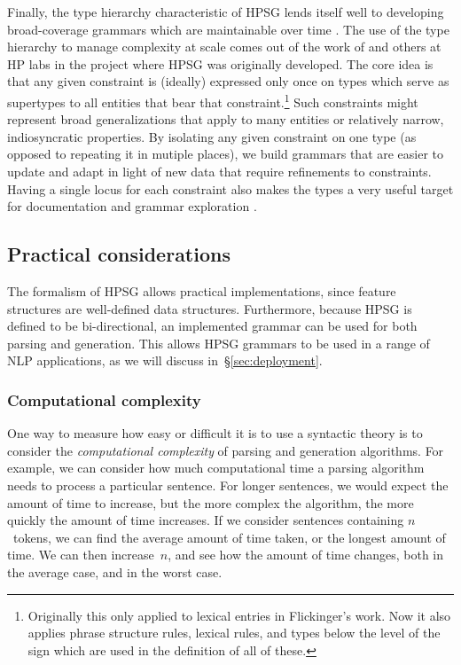 \documentclass[output=paper]{langsci/langscibook}
\begin{document}
Finally, the type hierarchy characteristic of HPSG lends itself well to developing broad-coverage grammars which are maintainable over time \citep{FIXME-find-cite?}. The use of the type hierarchy to manage complexity at scale comes out of the work of \citet{Flickinger87} and others at HP labs in the project where HPSG was originally developed. The core idea is that any given constraint is (ideally) expressed only once on types which serve as supertypes to all entities that bear that constraint.\footnote{Originally this only applied to lexical entries in Flickinger's work. Now it also applies phrase structure rules, lexical rules, and types below the level of the sign which are used in the definition of all of these.} Such constraints might represent broad generalizations that apply to many entities or relatively narrow, indiosyncratic properties. By isolating any given constraint on one type (as opposed to repeating it in mutiple places), we build grammars that are easier to update and adapt in light of new data that require refinements to constraints. Having a single locus for each constraint also makes the types a very useful target for documentation \citep{FIXME:LTDB} and grammar exploration \citep{FIXME:typediff}. 


\subsection{Practical considerations}
\label{sec:practical}

The formalism of HPSG allows practical implementations,
since feature structures are well-defined data structures.
Furthermore, because HPSG is defined to be bi-directional,
an implemented grammar can be used for both parsing and generation.
This allows HPSG grammars to be used in a range of NLP applications,
as we will discuss in~\S\ref{sec:deployment}.

\subsubsection{Computational complexity}

One way to measure how easy or difficult it is to use a syntactic theory
is to consider the \textit{computational complexity} of parsing and generation algorithms.
For example, we can consider how much computational time
a parsing algorithm needs to process a particular sentence.
For longer sentences, we would expect the amount of time to increase,
but the more complex the algorithm,
the more quickly the amount of time increases.
If we consider sentences containing $n$~tokens,
we can find the average amount of time taken,
or the longest amount of time.
We can then increase~$n$, and see how the amount of time changes,
both in the average case, and in the worst case.
\end{document}
